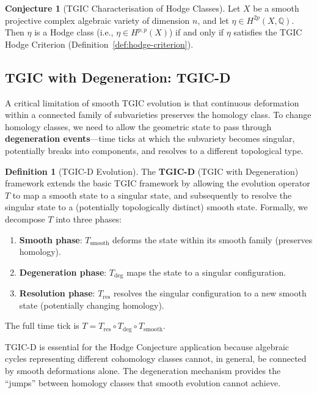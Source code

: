 \documentclass[11pt,a4paper]{article}
\theoremstyle{definition}
\newtheorem{definition}{Definition}[section]
\newtheorem{conjecture}{Conjecture}[section]
\theoremstyle{plain}
\newcommand{\QQ}{\mathbb{Q}}
\begin{document}
\begin{conjecture}[TGIC Characterisation of Hodge Classes]\label{conj:tgc}
Let $X$ be a smooth projective complex algebraic variety of dimension $n$, and let $\eta \in H^{2p}(X, \QQ)$. Then $\eta$ is a Hodge class (i.e., $\eta \in H^{p,p}(X)$) if and only if $\eta$ satisfies the TGIC Hodge Criterion (Definition~\ref{def:hodge-criterion}).
\end{conjecture}

\subsection{TGIC with Degeneration: TGIC-D}

A critical limitation of smooth TGIC evolution is that continuous deformation within a connected family of subvarieties preserves the homology class. To change homology classes, we need to allow the geometric state to pass through \textbf{degeneration events}---time ticks at which the subvariety becomes singular, potentially breaks into components, and resolves to a different topological type.

\begin{definition}[TGIC-D Evolution]\label{def:tgic-d}
The \textbf{TGIC-D} (TGIC with Degeneration) framework extends the basic TGIC framework by allowing the evolution operator $T$ to map a smooth state to a singular state, and subsequently to resolve the singular state to a (potentially topologically distinct) smooth state. Formally, we decompose $T$ into three phases:
\begin{enumerate}[nosep]
\item \textbf{Smooth phase}: $T_{\mathrm{smooth}}$ deforms the state within its smooth family (preserves homology).
\item \textbf{Degeneration phase}: $T_{\mathrm{deg}}$ maps the state to a singular configuration.
\item \textbf{Resolution phase}: $T_{\mathrm{res}}$ resolves the singular configuration to a new smooth state (potentially changing homology).
\end{enumerate}
The full time tick is $T = T_{\mathrm{res}} \circ T_{\mathrm{deg}} \circ T_{\mathrm{smooth}}$.
\end{definition}

TGIC-D is essential for the Hodge Conjecture application because algebraic cycles representing different cohomology classes cannot, in general, be connected by smooth deformations alone. The degeneration mechanism provides the ``jumps'' between homology classes that smooth evolution cannot achieve.
\end{document}

